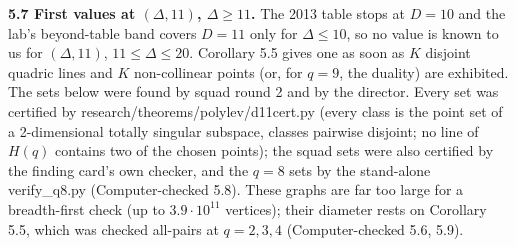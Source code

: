 \documentclass[
  10pt,
]{article}
\begin{document}
\textbf{5.7 First values at \((\Delta, 11)\), \(\Delta\ge 11\).} The
2013 table stops at \(D = 10\) and the lab's beyond-table band covers
\(D = 11\) only for \(\Delta\le 10\), so no value is known to us for
\((\Delta,11)\), \(11\le\Delta\le 20\). Corollary 5.5 gives one as soon
as \(K\) disjoint quadric lines and \(K\) non-collinear points (or, for
\(q = 9\), the duality) are exhibited. The sets below were found by
squad round 2 and by the director. Every set was certified by
research/theorems/polylev/d11cert.py (every class is the point set of a
2-dimensional totally singular subspace, classes pairwise disjoint; no
line of \(H(q)\) contains two of the chosen points); the squad sets were
also certified by the finding card's own checker, and the \(q = 8\) sets
by the stand-alone verify\_q8.py (Computer-checked 5.8). These graphs
are far too large for a breadth-first check (up to \(3.9\cdot 10^{11}\)
vertices); their diameter rests on Corollary 5.5, which was checked
all-pairs at \(q = 2, 3, 4\) (Computer-checked 5.6, 5.9).
\end{document}
